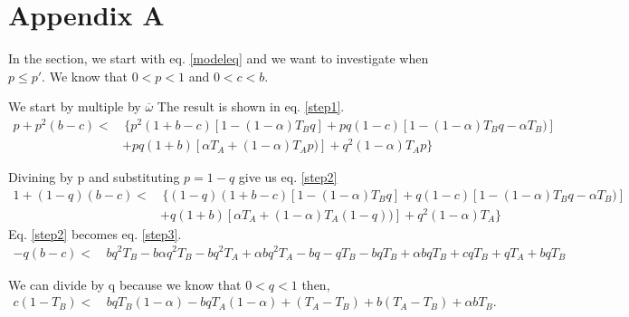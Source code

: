 \documentclass{article}
\begin{document}
\section*{Appendix A}
In the section, we start with eq. \eqref{modeleq} and we want to investigate when $p\leq p'$. We know that $0<p<1$ and $0<c<b$.

We start by multiple by $\overline{\omega}$ The result is shown in eq. \eqref{step1}.
\begin{equation} 
\begin{split} \label{step1}
p + p^2(b-c) < & \, \{ p^2(1+b-c)[1-(1-\alpha)T_Bq] + pq(1-c)[1-(1-\alpha)T_Bq-\alpha T_B)]\\
&+ pq(1+b)[\alpha T_A+(1-\alpha)T_Ap)] + q^2(1-\alpha)T_Ap\}
\end{split}
\end{equation}

Divining by p and substituting $p=1-q$ give us eq. \eqref{step2}
\begin{equation} 
\begin{split} \label{step2}
1 + (1-q)(b-c) < & \, \{ (1-q)(1+b-c)[1-(1-\alpha)T_Bq] + q(1-c)[1-(1-\alpha)T_Bq-\alpha T_B)]\\
&+ q(1+b)[\alpha T_A+(1-\alpha)T_A(1-q))] + q^2(1-\alpha)T_A\}
\end{split}
\end{equation}
Eq. \eqref{step2} becomes eq. \eqref{step3}.
\begin{equation} 
\begin{split}\label{step3}
 -q(b-c) < & \,  bq^2T_B-b\alpha q^2T_B - bq^2T_A + \alpha bq^2T_A - bq - qT_B - bqT_B + \alpha bqT_B +cqT_B + qT_A + bqT_B 
\end{split}
\end{equation}

We can divide by q because we know that $0<q<1$ then,
\begin{equation} 
\begin{split} \label{step4}
 c(1-T_B) < & \,  bqT_B(1-\alpha) - bqT_A(1-\alpha) + (T_A-T_B) + b(T_A - T_B) + \alpha bT_B.
\end{split}
\end{equation}
\end{document}
